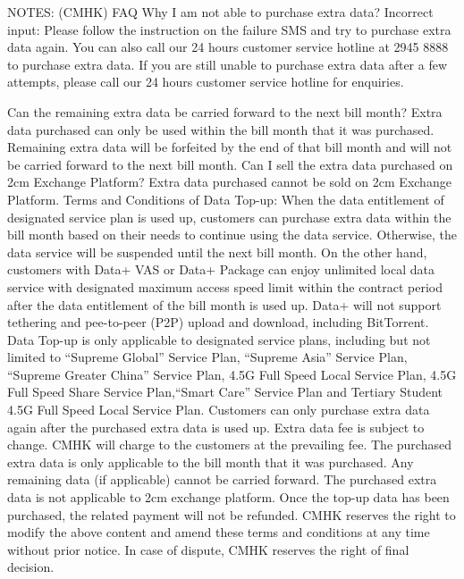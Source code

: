 \documentclass[12pt]{article}
\theoremstyle{definition}
\begin{document}
\begin{multicols}{2}
NOTES: (CMHK)
FAQ
Why I am not able to purchase extra data?
Incorrect input: Please follow the instruction on the failure SMS and try to
purchase extra data again. You can also call our 24 hours customer service
hotline at 2945 8888 to purchase extra data.
If you are still unable to purchase extra data after a few attempts, please call
our 24 hours customer service hotline for enquiries.

Can the remaining extra data be carried forward to the next bill month?
Extra data purchased can only be used within the bill month that it was
purchased. Remaining extra data will be forfeited by the end of that bill month
and will not be carried forward to the next bill month.
Can I sell the extra data purchased on 2cm Exchange Platform?
Extra data purchased cannot be sold on 2cm Exchange Platform.
Terms and Conditions of Data Top-up:
When the data entitlement of designated service plan is used up, customers can
purchase extra data within the bill month based on their needs to continue using
the data service. Otherwise, the data service will be suspended until the next
bill month. On the other hand, customers with Data+ VAS or Data+ Package can
enjoy unlimited local data service with designated maximum access speed limit
within the contract period after the data entitlement of the bill month is used
up. Data+ will not support tethering and pee-to-peer (P2P) upload and download,
including BitTorrent.
Data Top-up is only applicable to designated service plans, including but not
limited to “Supreme Global” Service Plan, “Supreme Asia” Service Plan, “Supreme
Greater China” Service Plan, 4.5G Full Speed Local Service Plan, 4.5G Full Speed
Share Service Plan,“Smart Care” Service Plan and Tertiary Student 4.5G Full
Speed Local Service Plan.
Customers can only purchase extra data again after the purchased extra data is
used up.
Extra data fee is subject to change. CMHK will charge to the customers at the
prevailing fee.
The purchased extra data is only applicable to the bill month that it was
purchased. Any remaining data (if applicable) cannot be carried forward.
The purchased extra data is not applicable to 2cm exchange platform.
Once the top-up data has been purchased, the related payment will not be
refunded.
CMHK reserves the right to modify the above content and amend these terms and
conditions at any time without prior notice.
In case of dispute, CMHK reserves the right of final decision.


\end{multicols}
\end{document}
